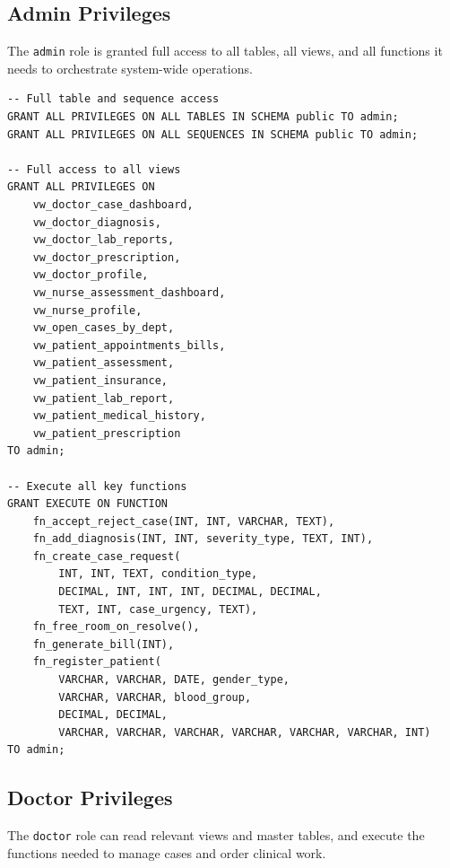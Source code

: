 \documentclass{article}
\begin{document}
\subsection{Admin Privileges}
 
The \texttt{admin} role is granted full access to all tables, all views, and all functions it needs to orchestrate system-wide operations.
 
\begin{lstlisting}
-- Full table and sequence access
GRANT ALL PRIVILEGES ON ALL TABLES IN SCHEMA public TO admin;
GRANT ALL PRIVILEGES ON ALL SEQUENCES IN SCHEMA public TO admin;
 
-- Full access to all views
GRANT ALL PRIVILEGES ON
    vw_doctor_case_dashboard,
    vw_doctor_diagnosis,
    vw_doctor_lab_reports,
    vw_doctor_prescription,
    vw_doctor_profile,
    vw_nurse_assessment_dashboard,
    vw_nurse_profile,
    vw_open_cases_by_dept,
    vw_patient_appointments_bills,
    vw_patient_assessment,
    vw_patient_insurance,
    vw_patient_lab_report,
    vw_patient_medical_history,
    vw_patient_prescription
TO admin;
 
-- Execute all key functions
GRANT EXECUTE ON FUNCTION
    fn_accept_reject_case(INT, INT, VARCHAR, TEXT),
    fn_add_diagnosis(INT, INT, severity_type, TEXT, INT),
    fn_create_case_request(
        INT, INT, TEXT, condition_type,
        DECIMAL, INT, INT, INT, DECIMAL, DECIMAL,
        TEXT, INT, case_urgency, TEXT),
    fn_free_room_on_resolve(),
    fn_generate_bill(INT),
    fn_register_patient(
        VARCHAR, VARCHAR, DATE, gender_type,
        VARCHAR, VARCHAR, blood_group,
        DECIMAL, DECIMAL,
        VARCHAR, VARCHAR, VARCHAR, VARCHAR, VARCHAR, VARCHAR, INT)
TO admin;
\end{lstlisting}
 
\subsection{Doctor Privileges}
 
The \texttt{doctor} role can read relevant views and master tables, and execute the functions needed to manage cases and order clinical work.
 
\end{document}
